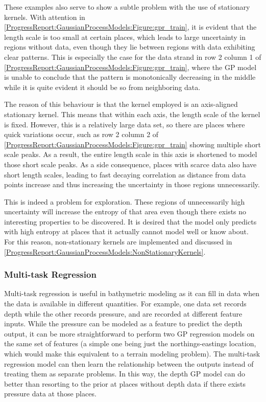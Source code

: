 				These examples also serve to show a subtle problem with the use of stationary kernels. With attention in \cref{ProgressReport:GaussianProcessModels:Figure:gpr_train}, it is evident that the length scale is too small at certain places, which leads to large uncertainty in regions without data, even though they lie between regions with data exhibiting clear patterns. This is especially the case for the data strand in row 2 column 1 of \cref{ProgressReport:GaussianProcessModels:Figure:gpr_train}, where the GP model is unable to conclude that the pattern is monotonically decreasing in the middle while it is quite evident it should be so from neighboring data.
				
				The reason of this behaviour is that the kernel employed is an axis-aligned stationary kernel. This means that within each axis, the length scale of the kernel is fixed. However, this is a relatively large data set, so there are places where quick variations occur, such as row 2 column 2 of \cref{ProgressReport:GaussianProcessModels:Figure:gpr_train} showing multiple short scale peaks. As a result, the entire length scale in this axis is shortened to model those short scale peaks. As a side consequence, places with scarce data also have short length scales, leading to fast decaying correlation as distance from data points increase and thus increasing the uncertainty in those regions unnecessarily.
				
				This is indeed a problem for exploration. These regions of unnecessarily high uncertainty will increase the entropy of that area even though there exists no interesting properties to be discovered. It is desired that the model only predicts with high entropy at places that it actually cannot model well or know about. For this reason, non-stationary kernels are implemented and discussed in \cref{ProgressReport:GaussianProcessModels:NonStationaryKernels}.
								
				\FloatBarrier
						
			\subsubsection{Multi-task Regression}

				Multi-task regression is useful in bathymetric modeling as it can fill in data when the data is available in different quantities. For example, one data set records depth while the other records pressure, and are recorded at different feature inputs. While the pressure can be modeled as a feature to predict the depth output, it can be more straightforward to perform two GP regression models on the same set of features (a simple one being just the northings-eastings location, which would make this equivalent to a terrain modeling problem). The multi-task regression model can then learn the relationship between the outputs instead of treating them as separate problems. In this way, the depth GP model can do better than resorting to the prior at places without depth data if there exists pressure data at those places.
				
